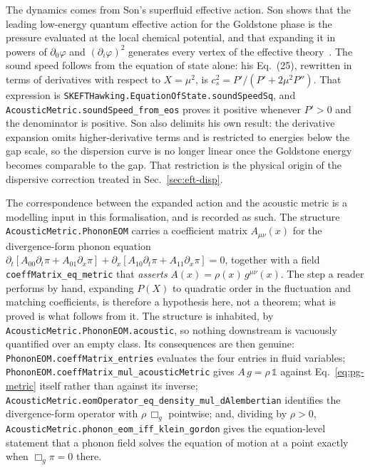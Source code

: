 \documentclass[aps,prd,reprint,nofootinbib,superscriptaddress]{revtex4-2}
\begin{document}
The dynamics comes from Son's superfluid effective action. Son shows that
the leading low-energy quantum effective action for the Goldstone phase
is the pressure evaluated at the local chemical potential, and that
expanding it in powers of $\partial_0\varphi$ and $(\partial_i\varphi)^2$
generates every vertex of the effective theory~\cite{Son2002}. The sound
speed follows from the equation of state alone: his Eq.~(25), rewritten
in terms of derivatives with respect to $X = \mu^{2}$, is
$c_s^{2} = P'/(P' + 2\mu^{2}P'')$. That expression is
\texttt{SKEFTHawking.EquationOfState.soundSpeedSq}, and
\texttt{AcousticMetric.soundSpeed\_from\_eos} proves it positive whenever
$P' > 0$ and the denominator is positive. Son also delimits his own
result: the derivative expansion omits higher-derivative terms and is
restricted to energies below the gap scale, so the dispersion curve is no
longer linear once the Goldstone energy becomes comparable to the gap.
That restriction is the physical origin of the dispersive correction
treated in Sec.~\ref{sec:eft-disp}.

The correspondence between the expanded action and the acoustic metric is
a modelling input in this formalisation, and is recorded as such. The
structure \texttt{AcousticMetric.PhononEOM} carries a coefficient matrix
$A_{\mu\nu}(x)$ for the divergence-form phonon equation
$\partial_t[A_{00}\partial_t\pi + A_{01}\partial_x\pi]
+ \partial_x[A_{10}\partial_t\pi + A_{11}\partial_x\pi] = 0$, together
with a field \texttt{coeffMatrix\_eq\_metric} that \emph{asserts}
$A(x) = \rho(x)\,g^{\mu\nu}(x)$. The step a reader performs by hand,
expanding $P(X)$ to quadratic order in the fluctuation and matching
coefficients, is therefore a hypothesis here, not a theorem; what is
proved is what follows from it. The structure is inhabited, by
\texttt{AcousticMetric.PhononEOM.acoustic}, so nothing downstream is
vacuously quantified over an empty class. Its consequences are then
genuine: \texttt{PhononEOM.coeffMatrix\_entries} evaluates the four
entries in fluid variables;
\texttt{PhononEOM.coeffMatrix\_mul\_acousticMetric} gives
$A\,g = \rho\,\mathbb{1}$ against Eq.~\eqref{eq:pg-metric} itself rather
than against its inverse;
\texttt{AcousticMetric.eomOperator\_eq\_density\_mul\_dAlembertian}
identifies the divergence-form operator with $\rho\,\Box_g$ pointwise;
and, dividing by $\rho > 0$,
\texttt{AcousticMetric.phonon\_eom\_iff\_klein\_gordon} gives the
equation-level statement that a phonon field solves the equation of
motion at a point exactly when $\Box_g\pi = 0$ there.
\end{document}
